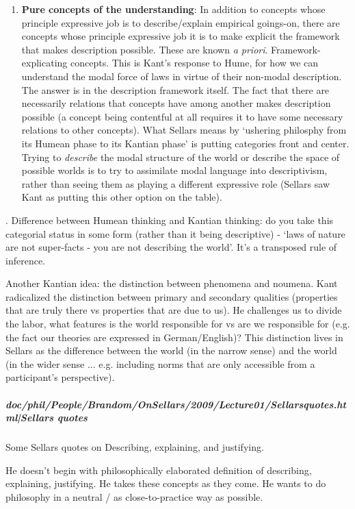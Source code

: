 \documentclass[12pt,a4paper]{report}
\begin{document}
\begin{enumerate}
\item \textbf{Pure concepts of the understanding}: In addition to concepts whose principle expressive job is to describe/explain empirical goings-on, there are concepts whose principle expressive job it is to make explicit the framework that makes description possible. These are known \textit{a priori}. Framework-explicating concepts. This is Kant's response to Hume, for how we can understand the modal force of laws in virtue of their non-modal description. The answer is in the description framework itself. The fact that there are necessarily relations that concepts have among another makes description possible (a concept being contentful at all requires it to have some necessary relations to other concepts). What Sellars means by `ushering philosphy from its Humean phase to its Kantian phase' is putting categories front and center. Trying to \emph{describe} the modal structure of the world or describe the space of possible worlds is to try to assimilate modal language into descriptivism, rather than seeing them as playing a different expressive role (Sellars saw Kant as putting this other option on the table).
\end{enumerate}. Difference between Humean thinking and Kantian thinking: do you take this categorial status in some form (rather than it being descriptive) - `laws of nature are not super-facts - you are not describing the world'. It's a transposed rule of inference.

Another Kantian idea: the distinction between phenomena and noumena. Kant radicalized the distinction between primary and secondary qualities (properties that are truly there vs properties that are due to us). He challenges us to divide the labor, what features is the world responsible for vs are we responsible for (e.g. the fact our theories are expressed in German/English)? This distinction lives in Sellars as the difference between the world (in the narrow sense) and the world (in the wider sense ... e.g. including norms that are only accessible from a participant's perspective).

\subparagraph{doc/phil/People/Brandom/OnSellars/2009/Lecture01/Sellarsquotes.html|Sellars quotes}
Some Sellars quotes on Describing, explaining, and justifying.

He doesn't begin with philosophically elaborated definition of describing, explaining, justifying. He takes these concepts as they come. He wants to do philosophy in a neutral / as close-to-practice way as possible.
\end{document}
